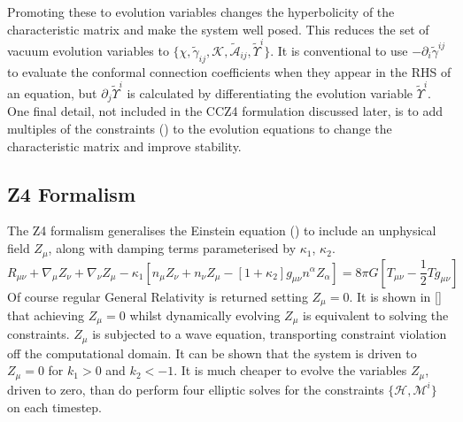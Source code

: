 \documentclass[11pt, oneside]{report}  %
\newcommand{\M}{\mathcal{M}}
\newcommand{\K}{\mathcal{K}}
\newcommand{\A}{\mathcal{A}}
\numberwithin{equation}{section}
\begin{document}
Promoting these to evolution variables changes the hyperbolicity of the characteristic matrix and make the system well posed. This reduces the set of vacuum evolution variables to $\{\chi,\tilde{\gamma}_{ij},\K,\tilde{\A}_{ij},\tilde{\Upsilon}^i \}$. It is conventional to use $-\partial_i \tilde{\gamma}^{ij}$ to evaluate the conformal connection coefficients when they appear in the RHS of an equation, but $\partial_j \tilde{\Upsilon}^i$ is calculated by differentiating the evolution variable $\tilde{\Upsilon}^i$. One final detail, not included in the CCZ4 formulation discussed later, is to add multiples of the constraints () to the evolution equations to change the characteristic matrix and improve stability.


\subsection{Z4 Formalism}
The Z4 formalism \cite{z4} generalises the Einstein equation () to include an unphysical field $Z_\mu$, along with damping terms parameterised by $\kappa_1$, $\kappa_2$. 
\begin{equation} R_{\mu\nu} + \nabla_\mu Z_\nu + \nabla_\nu Z_\mu - \kappa_1\left[ n_\mu Z_\nu + n_\nu Z_\mu - [1+\kappa_2]g_{\mu\nu}n^\alpha Z_\alpha\right] = 8\pi G \left[T_{\mu\nu}- \frac{1}{2}Tg_{\mu\nu} \right]\end{equation}
Of course regular General Relativity is returned setting $Z_\mu=0$. It is shown in [] that achieving $Z_\mu=0$ whilst dynamically evolving $Z_\mu$  is equivalent to solving the constraints. $Z_\mu$ is subjected to a wave equation, transporting constraint violation off the computational domain. It can be shown that the system is driven to $Z_\mu =0$ for $k_1>0$ and $k_2<-1$. It is much cheaper to evolve the variables $Z_\mu$, driven to zero, than do perform four elliptic solves for the constraints $\{\mathcal{H},\M^i\}$ on each timestep. 
\end{document}
